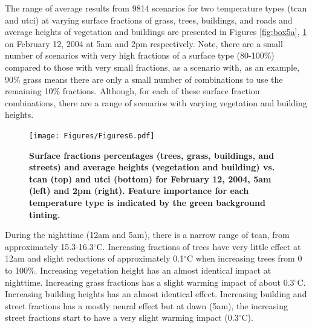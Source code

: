 \documentclass[final,3p,times,authoryear]{elsarticle}
\begin{document}














The range of average results from 9814 scenarios for two temperature types (\gls{tcan} and \gls{utci}) at varying surface fractions of grass, trees, buildings, and roads and average heights of vegetation and buildings are presented in Figures \ref{fig:box5a}, \ref{fig:box14a} on February 12, 2004 at 5am and 2pm respectively. Note, there are a small number of scenarios with very high fractions of a surface type (80-100\%) compared to those with very small fractions, as a scenario with, as an example, 90\% grass means there are only a small number of combinations to use the remaining 10\% fractions. Although, for each of these surface fraction combinations, there are a range of scenarios with varying vegetation and building heights.


\begin{figure}
\centering
\texttt{[image: Figures/Figures6.pdf]}
\caption{\bf Surface fractions percentages (trees, grass, buildings, and streets) and average heights (vegetation and building) vs. \gls{tcan} (top) and \gls{utci} (bottom) for February 12, 2004, 5am (left) and 2pm (right). Feature importance for each temperature type is indicated by the green background tinting.}
 \label{fig:box5a} \label{fig:box14a}
\end{figure} 





During the nighttime (12am and 5am), there is a narrow range of \gls{tcan}, from approximately 15.3-16.3$^{\circ}$C. Increasing fractions of trees have very little effect at 12am and slight reductions of approximately 0.1$^{\circ}$C when increasing trees from 0 to 100\%. Increasing vegetation height has an almost identical impact at nighttime. Increasing grass fractions has a slight warming impact of about 0.3$^{\circ}$C. Increasing building heights has an almost identical effect. Increasing building and street fractions has a mostly neural effect but at dawn (5am), the increasing street fractions start to have a very slight warming impact (0.3$^{\circ}$C). 
\end{document}
